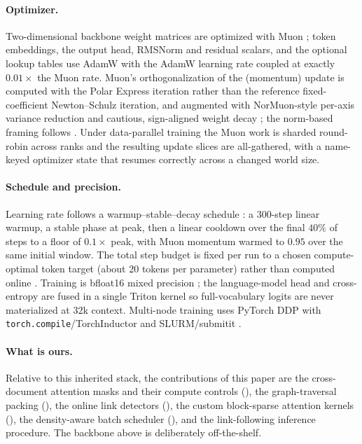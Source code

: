 \paragraph{Optimizer.}
Two-dimensional backbone weight matrices are optimized with Muon
\citep{jordan2024muon,liu2025muonscalable}; token embeddings, the output head,
RMSNorm and residual scalars, and the optional lookup tables use AdamW
\citep{loshchilov2019adamw} with the AdamW learning rate coupled at exactly
$0.01\times$ the Muon rate. Muon's orthogonalization of the (momentum) update is
computed with the Polar Express iteration \citep{amsel2025polarexpress} rather than
the reference fixed-coefficient Newton--Schulz iteration, and augmented with
NorMuon-style per-axis variance reduction \citep{li2025normuon,shazeer2018adafactor}
and cautious, sign-aligned weight decay \citep{liang2024cautious,chen2025cautiouswd};
the norm-based framing follows \citet{bernstein2024oldoptimizer}. Under data-parallel
training the Muon work is sharded round-robin across ranks and the resulting update
slices are all-gathered, with a name-keyed optimizer state that resumes correctly
across a changed world size.

\paragraph{Schedule and precision.}
Learning rate follows a warmup--stable--decay schedule
\citep{hu2024minicpm,hagele2024wsd}: a $300$-step linear warmup, a stable phase at
peak, then a linear cooldown over the final $40\%$ of steps to a floor of $0.1\times$
peak, with Muon momentum warmed to $0.95$ over the same initial window. The total
step budget is fixed per run to a chosen compute-optimal token target (about $20$
tokens per parameter) rather than computed online \citep{hoffmann2022chinchilla}.
Training is bfloat16 mixed precision \citep{micikevicius2018mixed}; the
language-model head and cross-entropy are fused in a single Triton kernel
\citep{hsu2024liger} so full-vocabulary logits are never materialized at $32$k
context. Multi-node training uses PyTorch DDP \citep{li2020pytorchddp} with
\texttt{torch.compile}/TorchInductor \citep{ansel2024pytorch2} and SLURM/submitit
\citep{submitit}.

\paragraph{What is ours.}
Relative to this inherited stack, the contributions of this paper are the
cross-document attention masks and their compute controls (), the
graph-traversal packing (), the online link detectors
(), the custom block-sparse attention kernels
(), the density-aware batch scheduler (), and the
link-following inference procedure. The backbone above is deliberately off-the-shelf.
